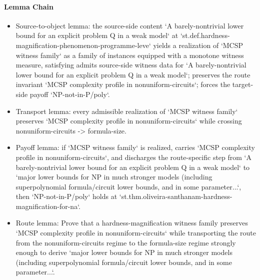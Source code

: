 \documentclass[11pt]{article}
\begin{document}
\paragraph{Lemma Chain}
\begin{itemize}
\item Source-to-object lemma: the source-side content `A barely-nontrivial lower bound for an explicit problem Q in a weak model` at `st.def.hardness-magnification-phenomenon-programme-leve` yields a realization of `MCSP witness family` as a family of instances equipped with a monotone witness measure, satisfying admits source-side witness data for `A barely-nontrivial lower bound for an explicit problem Q in a weak model`; preserves the route invariant `MCSP complexity profile in nonuniform-circuits`; forces the target-side payoff `NP-not-in-P/poly`.
\item Transport lemma: every admissible realization of `MCSP witness family` preserves `MCSP complexity profile in nonuniform-circuits` while crossing nonuniform-circuits -> formula-size.
\item Payoff lemma: if `MCSP witness family` is realized, carries `MCSP complexity profile in nonuniform-circuits`, and discharges the route-specific step from `A barely-nontrivial lower bound for an explicit problem Q in a weak model` to `major lower bounds for NP in much stronger models (including superpolynomial formula/circuit lower bounds, and in some parameter...`, then `NP-not-in-P/poly` holds at `st.thm.oliveira-santhanam-hardness-magnification-for-na`.
\item Route lemma: Prove that a hardness-magnification witness family preserves `MCSP complexity profile in nonuniform-circuits` while transporting the route from the nonuniform-circuits regime to the formula-size regime strongly enough to derive `major lower bounds for NP in much stronger models (including superpolynomial formula/circuit lower bounds, and in some parameter...`.
\end{itemize}
\end{document}
